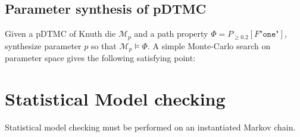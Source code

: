 \subsection{Parameter synthesis of pDTMC}

\begin{example}
    Given a pDTMC of Knuth die $\mathcal{M}_{p}$ and a path property $\Phi = P_{\geq 0.2} [F
                \texttt{"one"}]$, synthesize parameter $p$ so that $\mathcal{M}_{p} \models \Phi$. A simple
    Monte-Carlo search on parameter space gives the following satisfying point:
\end{example}
\section{Statistical Model checking}
Statistical model checking must be performed on an instantiated Markov chain.


